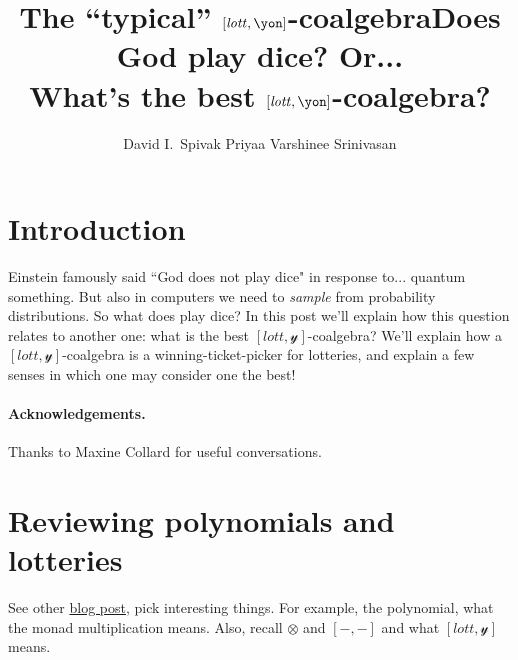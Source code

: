 \documentclass[11pt]{article}
\title{The ``typical'' $[\lott,\yon]$-coalgebra}
\title{Does God play dice? Or...\\What's the best $[\lott,\yon]$-coalgebra?}
\author{
   David I.\ Spivak \quad \quad \quad Priyaa Varshinee Srinivasan}
\date{\vspace{-.1in}}
\newcommand{\N}{\mathbb{N}}
\newcommand{\ox}{\otimes}
\newcommand{\Poly}{{\sf Poly}}
\newcommand{\lott}{\mathit{lott}}
\newcommand{\yon}{\mathcal{y}}
\begin{document}
\maketitle

\begin{abstract}

\end{abstract}

\section{Introduction}

Einstein famously said ``God does not play dice" in response to... quantum something. But also in computers we need to \emph{sample} from probability distributions. So what does play dice? In this post we'll explain how this question relates to another one: what is the best $[\lott,\yon]$-coalgebra? We'll explain how a $[\lott,\yon]$-coalgebra is a winning-ticket-picker for lotteries, and explain a few senses in which one may consider one the best!

\paragraph{Acknowledgements.} Thanks to Maxine Collard for useful conversations.

\section{Reviewing polynomials and lotteries}
See other \href{https://topos.site/blog/2023-03-23-distributions-and-lotteries/}{blog post}, pick interesting things. For example, the polynomial, what the monad multiplication means. Also, recall $\otimes$ and $[-,-]$ and what $[\lott,\yon]$ means.
%
%
%
%
%
\end{document}
